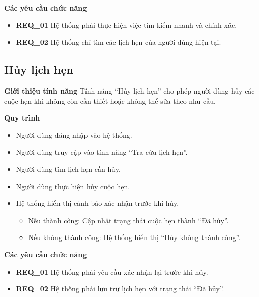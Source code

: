 \noindent \textbf{Các yêu cầu chức năng}
\begin{itemize}
    \item \textbf{REQ\_01} Hệ thống phải thực hiện việc tìm kiếm nhanh và chính xác.
    \item \textbf{REQ\_02} Hệ thống chỉ tìm các lịch hẹn của người dùng hiện tại.
\end{itemize}

\subsection{Hủy lịch hẹn}

\noindent \textbf{Giới thiệu tính năng}
Tính năng ``Hủy lịch hẹn'' cho phép người dùng hủy các cuộc hẹn khi không còn cần thiết hoặc không thể sửa theo nhu cầu.

\noindent \textbf{Quy trình}
\begin{itemize}
    \item Người dùng đăng nhập vào hệ thống.
    \item Người dùng truy cập vào tính năng ``Tra cứu lịch hẹn''.
    \item Người dùng tìm lịch hẹn cần hủy.
    \item Người dùng thực hiện hủy cuộc hẹn.
    \item Hệ thống hiển thị cảnh báo xác nhận trước khi hủy.
    \begin{itemize}
        \item Nếu thành công: Cập nhật trạng thái cuộc hẹn thành ``Đã hủy''.
        \item Nếu không thành công: Hệ thống hiển thị ``Hủy không thành công''.
    \end{itemize}
\end{itemize}

\noindent \textbf{Các yêu cầu chức năng}
\begin{itemize}
    \item \textbf{REQ\_01} Hệ thống phải yêu cầu xác nhận lại trước khi hủy.
    \item \textbf{REQ\_02} Hệ thống phải lưu trữ lịch hẹn với trạng thái ``Đã hủy''.
\end{itemize}